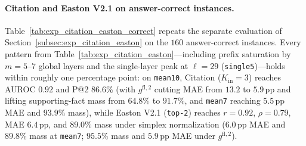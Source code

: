 \paragraph{Citation and Easton V2.1 on answer-correct instances.}
Table~\ref{tab:exp_citation_easton_correct} repeats the separate evaluation of Section~\ref{subsec:exp_citation_easton} on the $160$ answer-correct instances. Every pattern from Table~\ref{tab:exp_citation_easton}---including prefix saturation by $m = 5$--$7$ global layers and the single-layer peak at $\ell = 29$ (\texttt{single5})---holds within roughly one percentage point: on \texttt{mean10}, Citation ($K_{\text{in}} = 3$) reaches AUROC $0.92$ and P@2 $86.6\%$ (with $g^{\text{fl},2}$ cutting MAE from $13.2$ to $5.9$\,pp and lifting supporting-fact mass from $64.8\%$ to $91.7\%$, and \texttt{mean7} reaching $5.5$\,pp MAE and $93.9\%$ mass), while Easton V2.1 (\texttt{top-2}) reaches $r = 0.92$, $\rho = 0.79$, MAE $6.4$\,pp, and $89.0\%$ mass under simplex normalization ($6.0$\,pp MAE and $89.8\%$ mass at \texttt{mean7}; $95.5\%$ mass and $5.9$\,pp MAE under $g^{\text{fl},2}$).

